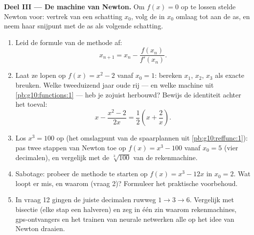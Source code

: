\begin{problem}
\medskip
\noindent\textbf{Deel III --- De machine van Newton.}
Om $f(x) = 0$ op te lossen stelde Newton voor: vertrek van een schatting
$x_0$, volg de  in $x_0$ omlaag tot aan de as, en neem haar snijpunt
met de as als volgende schatting.
\begin{enumerate}[resume]
  \item Leid de formule van de methode af:
        \[
        x_{n + 1} = x_n - \frac{f(x_n)}{f'(x_n)} .
        \]
  \item Laat ze lopen op $f(x) = x^2 - 2$ vanaf $x_0 = 1$: bereken $x_1$,
        $x_2$, $x_3$ als exacte breuken. Welke tweeduizend jaar oude rij ---
        en welke machine uit \cref{pb:g10:functions:1} --- heb je zojuist
        herbouwd? Bewijs de identiteit achter het toeval:
        \[
        x - \frac{x^2 - 2}{2x} = \frac12\left(x + \frac2x\right).
        \]
  \item Los $x^3 = 100$ op (het omslagpunt van de spaarplannen uit
        \cref{pb:g10:reffunc:1}): pas twee stappen van Newton toe op
        $f(x) = x^3 - 100$ vanaf $x_0 = 5$ (vier decimalen), en vergelijk met
        de $\sqrt[3]{100}$ van de rekenmachine.
  \item Sabotage: probeer de methode te starten op $f(x) = x^3 - 12x$ in
        $x_0 = 2$. Wat loopt er mis, en waarom (vraag 2)? Formuleer het
        praktische voorbehoud.
  \item In vraag 12 gingen de juiste decimalen ruwweg $1 \to 3 \to 6$.
        Vergelijk met bisectie (elke stap een  halveren) en zeg in
        één zin waarom rekenmachines, gps-ontvangers en het trainen van
        neurale netwerken alle op het idee van Newton draaien.
\end{enumerate}


\end{problem}
